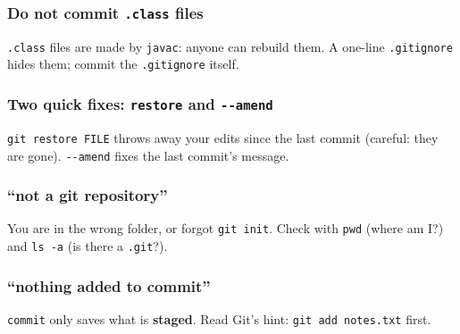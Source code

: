 \documentclass[aspectratio=169,10pt,compress]{beamer}
\begin{document}
\begin{frame}[t,fragile] \frametitle{Do not commit \texttt{.class} files}

  \vspace{0.1em}
  \small
  \texttt{.class} files are made by \texttt{javac}: anyone can rebuild them. A one-line \texttt{.gitignore} hides them; commit the \texttt{.gitignore} itself.
\end{frame}




\begin{frame}[t,fragile] \frametitle{Two quick fixes: \texttt{restore} and \texttt{-{}-amend}}

  \vspace{0.1em}
  \small
  \texttt{git restore FILE} throws away your edits since the last commit (careful: they are gone). \texttt{-{}-amend} fixes the last commit's message.
\end{frame}





\begin{frame}[t,fragile] \frametitle{``not a git repository''}

  \vspace{0.1em}
  \small
  You are in the wrong folder, or forgot \texttt{git init}. Check with \texttt{pwd} (where am I?) and \texttt{ls -a} (is there a \texttt{.git}?).
\end{frame}




\begin{frame}[t,fragile] \frametitle{``nothing added to commit''}

  \vspace{0.1em}
  \small
  \texttt{commit} only saves what is \textbf{staged}. Read Git's hint: \texttt{git add notes.txt} first.
\end{frame}
\end{document}
